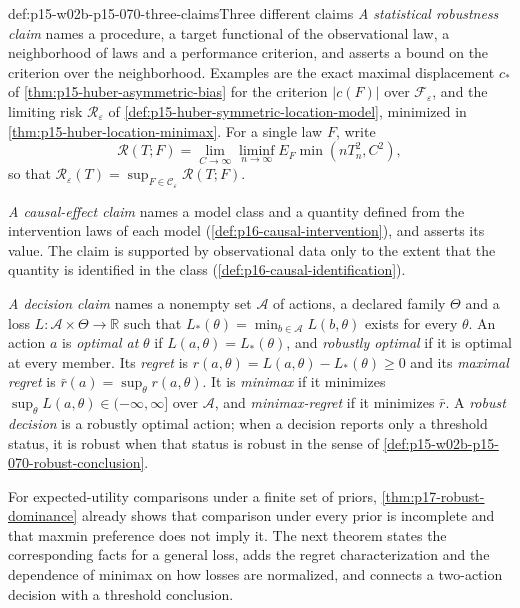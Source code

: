\begin{hbdefinition}{def:p15-w02b-p15-070-three-claims}{Three different claims}
\emph{A statistical robustness claim} names a procedure, a target
functional of the observational law, a neighborhood of laws and a
performance criterion, and asserts a bound on the criterion over the
neighborhood. Examples are the exact maximal displacement \(c_*\) of
\cref{thm:p15-huber-asymmetric-bias} for the criterion
\(|c(F)|\) over \(\mathcal F_\varepsilon\), and the limiting risk
\(\mathcal R_\varepsilon\) of
\cref{def:p15-huber-symmetric-location-model}, minimized in
\cref{thm:p15-huber-location-minimax}. For a single law \(F\), write
\[
 \mathcal R(T;F)=\lim_{C\to\infty}\liminf_{n\to\infty}
                  E_F\min(nT_n^2,C^2),
\]
so that \(\mathcal R_\varepsilon(T)=\sup_{F\in\mathcal C_\varepsilon}
\mathcal R(T;F)\).

\emph{A causal-effect claim} names a model class and a quantity defined
from the intervention laws of each model
(\cref{def:p16-causal-intervention}), and asserts its value. The claim is
supported by observational data only to the extent that the quantity is
identified in the class (\cref{def:p16-causal-identification}).

\emph{A decision claim} names a nonempty set \(\mathcal A\) of actions,
a declared family \(\Theta\) and a loss
\(L:\mathcal A\times\Theta\to\mathbb R\) such that
\(L_*(\theta)=\min_{b\in\mathcal A}L(b,\theta)\) exists for every
\(\theta\). An action \(a\) is \emph{optimal at} \(\theta\) if
\(L(a,\theta)=L_*(\theta)\), and \emph{robustly optimal} if it is
optimal at every member. Its \emph{regret} is
\(r(a,\theta)=L(a,\theta)-L_*(\theta)\geq0\) and its \emph{maximal
regret} is \(\bar r(a)=\sup_\theta r(a,\theta)\). It is \emph{minimax}
if it minimizes \(\sup_\theta L(a,\theta)\in(-\infty,\infty]\) over
\(\mathcal A\), and \emph{minimax-regret} if it minimizes \(\bar r\).
A \emph{robust decision} is a robustly optimal action; when a decision
reports only a threshold status, it is robust when that status is robust
in the sense of \cref{def:p15-w02b-p15-070-robust-conclusion}.
\end{hbdefinition}

For expected-utility comparisons under a finite set of priors,
\cref{thm:p17-robust-dominance} already shows that comparison under every
prior is incomplete and that maxmin preference does not imply it. The
next theorem states the corresponding facts for a general loss, adds the
regret characterization and the dependence of minimax on how losses are
normalized, and connects a two-action decision with a threshold
conclusion.

